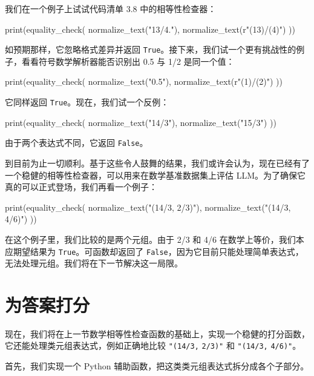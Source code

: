 我们在一个例子上试试代码清单 3.8 中的相等性检查器：

\begin{codebox}
print(equality_check(
    normalize_text("13/4."),
    normalize_text(r"(13)/(4)")
))
\end{codebox}

如预期那样，它忽略格式差异并返回 \texttt{True}。接下来，我们试一个更有挑战性的例子，看看符号数学解析器能否识别出 0.5 与 1/2 是同一个值：

\begin{codebox}
print(equality_check(
    normalize_text("0.5"),
    normalize_text(r"(1)/(2)")
))
\end{codebox}

它同样返回 \texttt{True}。现在，我们试一个反例：

\begin{codebox}
print(equality_check(
    normalize_text("14/3"),
    normalize_text("15/3")
))
\end{codebox}

由于两个表达式不同，它返回 \texttt{False}。

到目前为止一切顺利。基于这些令人鼓舞的结果，我们或许会认为，现在已经有了一个稳健的相等性检查器，可以用来在数学基准数据集上评估 LLM。为了确保它真的可以正式登场，我们再看一个例子：

\begin{codebox}
print(equality_check(
    normalize_text("(14/3, 2/3)"),
    normalize_text("(14/3, 4/6)")
))
\end{codebox}

在这个例子里，我们比较的是两个元组。由于 2/3 和 4/6 在数学上等价，我们本应期望结果为 \texttt{True}。可函数却返回了 \texttt{False}，因为它目前只能处理简单表达式，无法处理元组。我们将在下一节解决这一局限。

\section{为答案打分}

现在，我们将在上一节数学相等性检查函数的基础上，实现一个稳健的打分函数，它还能处理类元组表达式，例如正确地比较 \texttt{"}\texttt{(14/3,} \texttt{2/3)}\texttt{"} 和 \texttt{"}\texttt{(14/3,} \texttt{4/6)}\texttt{"}。

首先，我们实现一个 Python 辅助函数，把这类类元组表达式拆分成各个子部分。

